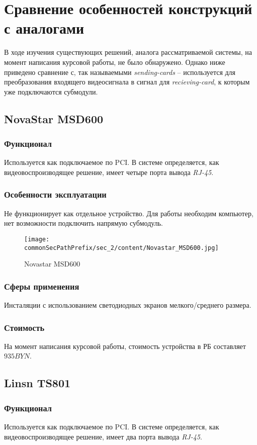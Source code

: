 \section{Сравнение особенностей конструкций с аналогами}
\label{sec:analogs}
В ходе изучения существующих решений, аналога рассматриваемой системы, на момент написания курсовой работы, не было обнаружено. Однако ниже приведено сравнение с, так называемыми \textit{sending-cards} -- используется для преобразования входящего видеосигнала в сигнал для \textit{recieving-card}, к которым уже подключаются субмодули.

\subsection{NovaStar MSD600}
\subsubsection{Функционал}
Используется как подключаемое по PCI. В системе определяется, как видеовоспроизводящее решение, имеет четыре порта вывода \textit{RJ-45}. 
\subsubsection{Особенности эксплуатации}
Не функционирует как отдельное устройство. Для работы необходим компьютер, нет возможности подключить напрямую субмодуль.
\begin{figure}[ht]
    \centering
    \texttt{[image: \\commonSecPathPrefix/sec\_2/content/Novastar\_MSD600.jpg]}
    \caption{Novastar MSD600}
\end{figure}
\subsubsection{Сферы применения}
Инсталяции с использованием светодиодных экранов мелкого/среднего размера.
\subsubsection{Стоимость}
На момент написания курсовой работы, стоимость устройства в РБ составляет \(935 BYN\).

\subsection{Linsn TS801}
\subsubsection{Функционал}
Используется как подключаемое по PCI. В системе определяется, как видеовоспроизводящее решение, имеет два порта вывода \textit{RJ-45}. 
